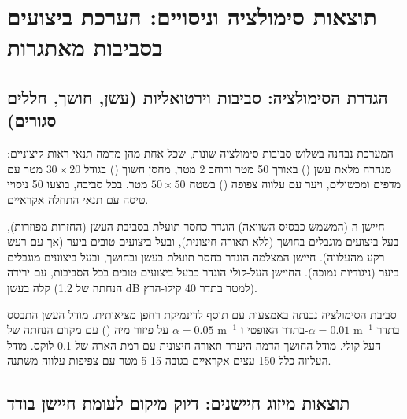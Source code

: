 

\section{תוצאות סימולציה וניסויים: הערכת ביצועים בסביבות מאתגרות}
\label{sec:ch08_results}

\subsection{הגדרת הסימולציה: סביבות וירטואליות (עשן, חושך, חללים סגורים)}
\label{sec:ch08_simulation_setup}

המערכת נבחנה בשלוש סביבות סימולציה שונות, שכל אחת מהן מדמה תנאי ראות קיצוניים: מנהרה מלאת עשן () באורך 50 מטר ורוחב 2 מטר, מחסן חשוך () בגודל $30 \times 20$ מטר עם מדפים ומכשולים, ויער עם עלווה צפופה () בשטח $50 \times 50$ מטר. בכל סביבה, בוצעו 50 ניסויי טיסה עם תנאי התחלה אקראיים. \cite{CrewAIDocs}

חיישן ה (המשמש כבסיס השוואה) הוגדר כחסר תועלת בסביבת העשן (החזרות מפוזרות), בעל ביצועים מוגבלים בחושך (ללא תאורה חיצונית), ובעל ביצועים טובים ביער (אך עם רעש רקע מהעלווה). חיישן המצלמה הוגדר כחסר תועלת בעשן ובחושך, ובעל ביצועים מוגבלים ביער (ניגודיות נמוכה). החיישן העל-קולי הוגדר כבעל ביצועים טובים בכל הסביבות, עם ירידה קלה בעשן (הנחתה של 1.2 dB למטר בתדר 40 קילו-הרץ). \cite{CrewAIDocs}

סביבת הסימולציה נבנתה באמצעות  עם תוסף  לדינמיקת רחפן מציאותית. מודל העשן התבסס על פיזור מיה () עם מקדם הנחתה של $\alpha = 0.05$ m$^{-1}$ בתדר האופטי ו-$\alpha = 0.01$ m$^{-1}$ בתדר העל-קולי. מודל החושך הדמה היעדר תאורה חיצונית עם רמת הארה של 0.1 לוקס. מודל העלווה כלל 150 עצים אקראיים בגובה 5-15 מטר עם צפיפות עלווה משתנה. \cite{Thrun2005ProbRobotics}

\subsection{תוצאות מיזוג חיישנים: דיוק מיקום לעומת חיישן בודד}
\label{sec:ch08_fusion_results}

